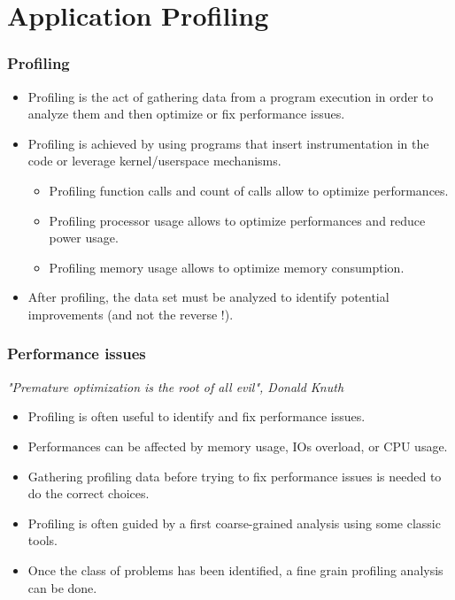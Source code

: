 \section{Application Profiling}

\begin{frame}
  \frametitle{Profiling}
  \begin{itemize}
    \item Profiling is the act of gathering data from a program execution in
          order to analyze them and then optimize or fix performance issues.
    \item Profiling is achieved by using programs that insert instrumentation
          in the code or leverage kernel/userspace mechanisms.
    \begin{itemize}
      \item Profiling function calls and count of calls allow to optimize
            performances.
      \item Profiling processor usage allows to optimize performances and
            reduce power usage.
      \item Profiling memory usage allows to optimize memory consumption.
    \end{itemize}
    \item After profiling, the data set must be analyzed to identify potential
          improvements (and not the reverse !).
  \end{itemize}
\end{frame}

\begin{frame}
  \frametitle{Performance issues}
  \begin{center}
    \vspace{0.2cm}
    \em{"Premature optimization is the root of all evil", Donald Knuth}
  \end{center}
  \begin{itemize}
    \item Profiling is often useful to identify and fix performance issues.
    \item Performances can be affected by memory usage, IOs overload, or
          CPU usage.
    \item Gathering profiling data before trying to fix performance issues is
          needed to do the correct choices.
    \item Profiling is often guided by a first coarse-grained analysis using
          some classic tools.
    \item Once the class of problems has been identified, a fine grain
          profiling analysis can be done.
  \end{itemize}
\end{frame}

